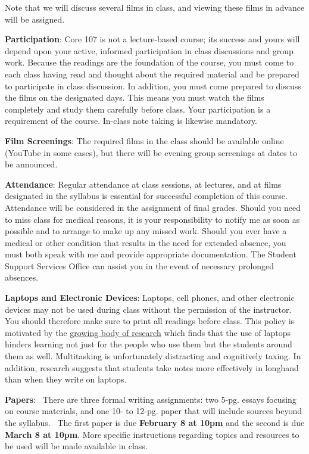 \documentclass[10pt,preprint]{aastex}
\begin{document}
Note that we will discuss several films in class, and viewing these films in advance will be assigned.  

\textbf{Participation}:  Core 107 is not a lecture-based course; its success and yours will depend upon your active, informed participation in class discussions and group work. Because the readings are the foundation of the course, you must come to each class having read and thought about the required material and be prepared to participate in class discussion.  In addition, you must come prepared to discuss the films on the designated days.  This means you must watch the films completely and study them carefully before class. Your participation is a requirement of the course.  In-class note taking is likewise mandatory.

\textbf{Film Screenings}:  The required films in the class should be available online (YouTube in some cases), but there will be evening group screenings at dates to be announced.

\textbf{Attendance}: Regular attendance at class sessions, at lectures, and at films designated in the syllabus is essential for successful completion of this course. Attendance will be considered in the assignment of final grades. Should you need to miss class for medical reasons, it is your responsibility to notify me as soon as possible and to arrange to make up any missed work.  Should you ever have a medical or other condition that results in the need for extended absence, you must both speak with me and provide appropriate documentation.  The Student Support Services Office can assist you in the event of necessary prolonged absences.

\textbf{Laptops and Electronic Devices}:
Laptops, cell phones, and other electronic devices may not be used during class without the permission of the instructor. You should therefore make sure to print all readings before class. This policy is motivated by the \href{http://www.sciencedirect.com/science/article/pii/S0360131512002254}{growing body of research} which finds that the use of laptops hinders learning not just for the people who use them but the students around them as well. Multitasking is unfortunately distracting and cognitively taxing. In addition, research suggests that students take notes more effectively in longhand than when they write on laptops.

\textbf{Papers}:  There are three formal writing assignments: two 5-pg. essays focusing on course materials, and one 10- to 12-pg. paper that will include sources beyond the syllabus.  The first paper is due \textbf{February 8 at 10pm} and the second is due \textbf{March 8 at 10pm}.  More specific instructions regarding topics and resources to be used will be made available in class.
\end{document}
